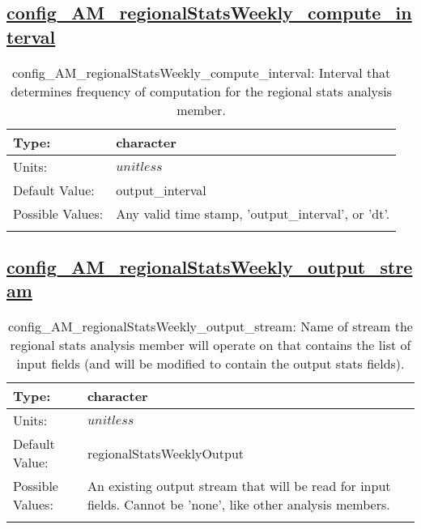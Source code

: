 \subsection[config\_AM\_regionalStatsWeekly\_compute\_interval]{\hyperref[sec:nm_tab_AM_regionalStatsWeekly]{config\_AM\_regionalStatsWeekly\_compute\_interval}}
\label{subsec:nm_sec_config_AM_regionalStatsWeekly_compute_interval}
\begin{center}
\begin{longtable}{| p{2.0in} || p{4.0in} |}
    \hline
    Type: & character \\
    \hline
    Units: & $unitless$ \\
    \hline
    Default Value: & output\_interval \\
    \hline
    Possible Values: & Any valid time stamp, 'output\_interval', or 'dt'. \\
    \hline
    \caption{config\_AM\_regionalStatsWeekly\_compute\_interval: Interval that determines frequency of computation for the regional stats analysis member.}
\end{longtable}
\end{center}
\subsection[config\_AM\_regionalStatsWeekly\_output\_stream]{\hyperref[sec:nm_tab_AM_regionalStatsWeekly]{config\_AM\_regionalStatsWeekly\_output\_stream}}
\label{subsec:nm_sec_config_AM_regionalStatsWeekly_output_stream}
\begin{center}
\begin{longtable}{| p{2.0in} || p{4.0in} |}
    \hline
    Type: & character \\
    \hline
    Units: & $unitless$ \\
    \hline
    Default Value: & regionalStatsWeeklyOutput \\
    \hline
    Possible Values: & An existing output stream that will be read for input fields. Cannot be 'none', like other analysis members. \\
    \hline
    \caption{config\_AM\_regionalStatsWeekly\_output\_stream: Name of stream the regional stats analysis member will operate on that contains the list of input fields (and will be modified to contain the output stats fields).}
\end{longtable}
\end{center}
